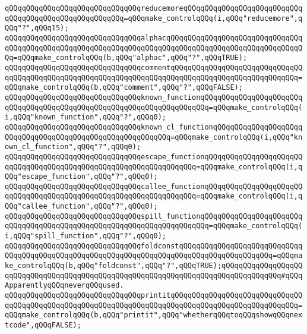 \verb|qQQqqQQqqQQqqQQqqQQqqQQqqQQqqQQqreducemoreqQQqqQQqqQQqqQQqqQQqqQQqqQQqqQQqqQQqqQQqqQQqqQQqqQQqqQQq=qQQqmake_controlqQQq(i,qQQq"reducemore",qQQq"?",qQQq15);|\newline
\newline
\verb|qQQqqQQqqQQqqQQqqQQqqQQqqQQqqQQqalphacqQQqqQQqqQQqqQQqqQQqqQQqqQQqqQQqqQQqqQQqqQQqqQQqqQQqqQQqqQQqqQQqqQQqqQQqqQQqqQQqqQQqqQQqqQQqqQQqqQQqqQQq=qQQqmake_controlqQQq(b,qQQq"alphac",qQQq"?",qQQqTRUE);|\newline
\verb|qQQqqQQqqQQqqQQqqQQqqQQqqQQqqQQqcommentqQQqqQQqqQQqqQQqqQQqqQQqqQQqqQQqqQQqqQQqqQQqqQQqqQQqqQQqqQQqqQQqqQQqqQQqqQQqqQQqqQQqqQQqqQQqqQQqqQQq=qQQqmake_controlqQQq(b,qQQq"comment",qQQq"?",qQQqFALSE);|\newline
\newline
\verb|qQQqqQQqqQQqqQQqqQQqqQQqqQQqqQQqknown_functionqQQqqQQqqQQqqQQqqQQqqQQqqQQqqQQqqQQqqQQqqQQqqQQqqQQqqQQqqQQqqQQqqQQqqQQq=qQQqmake_controlqQQq(i,qQQq"known_function",qQQq"?",qQQq0);|\newline
\verb|qQQqqQQqqQQqqQQqqQQqqQQqqQQqqQQqknown_cl_functionqQQqqQQqqQQqqQQqqQQqqQQqqQQqqQQqqQQqqQQqqQQqqQQqqQQqqQQqqQQq=qQQqmake_controlqQQq(i,qQQq"known_cl_function",qQQq"?",qQQq0);|\newline
\newline
\verb|qQQqqQQqqQQqqQQqqQQqqQQqqQQqqQQqescape_functionqQQqqQQqqQQqqQQqqQQqqQQqqQQqqQQqqQQqqQQqqQQqqQQqqQQqqQQqqQQqqQQqqQQq=qQQqmake_controlqQQq(i,qQQq"escape_function",qQQq"?",qQQq0);|\newline
\verb|qQQqqQQqqQQqqQQqqQQqqQQqqQQqqQQqcallee_functionqQQqqQQqqQQqqQQqqQQqqQQqqQQqqQQqqQQqqQQqqQQqqQQqqQQqqQQqqQQqqQQqqQQq=qQQqmake_controlqQQq(i,qQQq"callee_function",qQQq"?",qQQq0);|\newline
\newline
\verb|qQQqqQQqqQQqqQQqqQQqqQQqqQQqqQQqspill_functionqQQqqQQqqQQqqQQqqQQqqQQqqQQqqQQqqQQqqQQqqQQqqQQqqQQqqQQqqQQqqQQqqQQqqQQq=qQQqmake_controlqQQq(i,qQQq"spill_function",qQQq"?",qQQq0);|\newline
\verb|qQQqqQQqqQQqqQQqqQQqqQQqqQQqqQQqfoldconstqQQqqQQqqQQqqQQqqQQqqQQqqQQqqQQqqQQqqQQqqQQqqQQqqQQqqQQqqQQqqQQqqQQqqQQqqQQqqQQqqQQqqQQqqQQq=qQQqmake_controlqQQq(b,qQQq"foldconst",qQQq"?",qQQqTRUE);qQQqqQQqqQQqqQQqqQQqqQQqqQQqqQQqqQQqqQQqqQQqqQQqqQQqqQQqqQQqqQQqqQQqqQQqqQQqqQQqqQQq#qQQqApparentlyqQQqneverqQQqused.|\newline
\newline
\verb|qQQqqQQqqQQqqQQqqQQqqQQqqQQqqQQqprintitqQQqqQQqqQQqqQQqqQQqqQQqqQQqqQQqqQQqqQQqqQQqqQQqqQQqqQQqqQQqqQQqqQQqqQQqqQQqqQQqqQQqqQQqqQQqqQQqqQQq=qQQqmake_controlqQQq(b,qQQq"printit",qQQq"whetherqQQqtoqQQqshowqQQqnextcode",qQQqFALSE);|\newline

